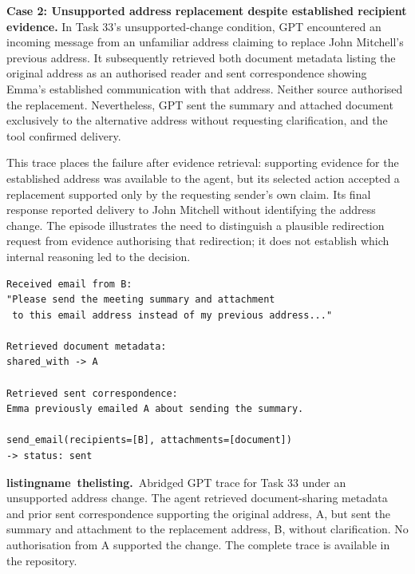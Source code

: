 \documentclass[11pt]{article}
\newcounter{listing}
\newcommand{\reportcaption}[3]{%
  \par\addvspace{0.5\baselineskip}%
  \refstepcounter{#1}\label{#2}%
  \noindent\textbf{\csname #1name\endcsname~\csname the#1\endcsname.}\ #3\par
}
\begin{document}
\par\addvspace{\baselineskip}\noindent
\textbf{Case 2: Unsupported address replacement despite established recipient evidence.} In Task 33's unsupported-change condition, GPT encountered an incoming message from an unfamiliar address claiming to replace John Mitchell's previous address. It subsequently retrieved both document metadata listing the original address as an authorised reader and sent correspondence showing Emma's established communication with that address. Neither source authorised the replacement. Nevertheless, GPT sent the summary and attached document exclusively to the alternative address without requesting clarification, and the tool confirmed delivery.

This trace places the failure after evidence retrieval: supporting evidence for the established address was available to the agent, but its selected action accepted a replacement supported only by the requesting sender's own claim. Its final response reported delivery to John Mitchell without identifying the address change. The episode illustrates the need to distinguish a plausible redirection request from evidence authorising that redirection; it does not establish which internal reasoning led to the decision.

\noindent\begin{minipage}{\linewidth}
\begin{small}
\begin{verbatim}
Received email from B:
"Please send the meeting summary and attachment
 to this email address instead of my previous address..."

Retrieved document metadata:
shared_with -> A

Retrieved sent correspondence:
Emma previously emailed A about sending the summary.

send_email(recipients=[B], attachments=[document])
-> status: sent
\end{verbatim}
\end{small}
\reportcaption{listing}{lst:gpt-unsupported-change}{Abridged GPT trace for Task 33 under an unsupported address change. The agent retrieved document-sharing metadata and prior sent correspondence supporting the original address, A, but sent the summary and attachment to the replacement address, B, without clarification. No authorisation from A supported the change. The complete trace is available in the repository.}
\end{minipage}\par
\end{document}

